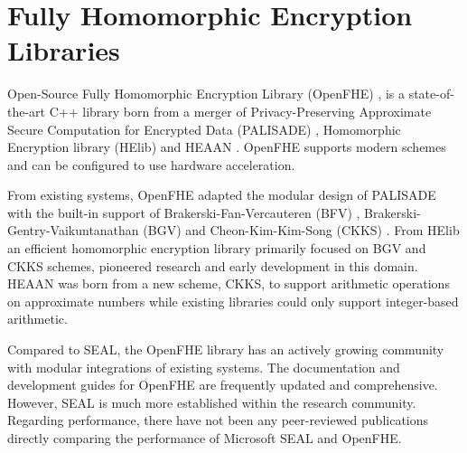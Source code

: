 \section{Fully Homomorphic Encryption Libraries}
\label{sec:Related FHE Libraries}
Open-Source Fully Homomorphic Encryption Library (OpenFHE) \cite{Al_Badawi2022-openFHE}, is a state-of-the-art C++ library born from a merger of Privacy-Preserving Approximate Secure Computation for Encrypted Data (PALISADE) \cite{PALISADE}, Homomorphic Encryption library (HElib) \cite{HElib} and HEAAN \cite{Cheon2017-CKKS}. OpenFHE supports modern schemes and can be configured to use hardware acceleration.

From existing systems, OpenFHE adapted the modular design of PALISADE with the built-in support of Brakerski-Fan-Vercauteren (BFV) \cite{fan2012-bfv}, Brakerski-Gentry-Vaikuntanathan (BGV) \cite{brakerski2012-bgv} and Cheon-Kim-Kim-Song (CKKS) \cite{Cheon2017-CKKS}. From HElib an efficient homomorphic encryption library primarily focused on BGV and CKKS schemes, pioneered research and early development in this domain. HEAAN was born from a new scheme, CKKS, to support arithmetic operations on approximate numbers while existing libraries could only support integer-based arithmetic.

Compared to SEAL, the OpenFHE library has an actively growing community with modular integrations of existing systems. The documentation and development guides for OpenFHE are frequently updated and comprehensive. However, SEAL is much more established within the research community. Regarding performance, there have not been any peer-reviewed publications directly comparing the performance of Microsoft SEAL and OpenFHE.
